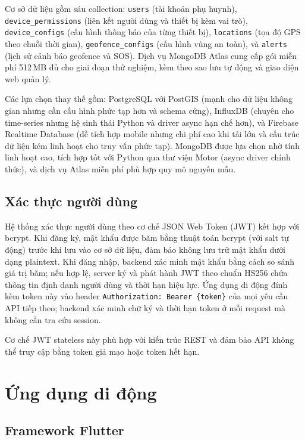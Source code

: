 \documentclass[../DoAn.tex]{subfiles}
\begin{document}
Cơ sở dữ liệu gồm sáu collection: \texttt{users} (tài khoản phụ huynh), \texttt{device\_permissions} (liên kết người dùng và thiết bị kèm vai trò), \texttt{device\_configs} (cấu hình thông báo của từng thiết bị), \texttt{locations} (tọa độ GPS theo chuỗi thời gian), \texttt{geofence\_configs} (cấu hình vùng an toàn), và \texttt{alerts} (lịch sử cảnh báo geofence và SOS). Dịch vụ MongoDB Atlas cung cấp gói miễn phí 512\,MB đủ cho giai đoạn thử nghiệm, kèm theo sao lưu tự động và giao diện web quản lý.

Các lựa chọn thay thế gồm: PostgreSQL với PostGIS (mạnh cho dữ liệu không gian nhưng cần cấu hình phức tạp hơn và schema cứng), InfluxDB (chuyên cho time-series nhưng hệ sinh thái Python và driver async hạn chế hơn), và Firebase Realtime Database (dễ tích hợp mobile nhưng chi phí cao khi tải lớn và cấu trúc dữ liệu kém linh hoạt cho truy vấn phức tạp). MongoDB được lựa chọn nhờ tính linh hoạt cao, tích hợp tốt với Python qua thư viện Motor (async driver chính thức), và dịch vụ Atlas miễn phí phù hợp quy mô nguyên mẫu.

\subsection{Xác thực người dùng}
\label{subsection:3.3.3}

Hệ thống xác thực người dùng theo cơ chế JSON Web Token (JWT) kết hợp với bcrypt. Khi đăng ký, mật khẩu được băm bằng thuật toán bcrypt (với salt tự động) trước khi lưu vào cơ sở dữ liệu, đảm bảo không lưu trữ mật khẩu dưới dạng plaintext. Khi đăng nhập, backend xác minh mật khẩu bằng cách so sánh giá trị băm; nếu hợp lệ, server ký và phát hành JWT theo chuẩn HS256 chứa thông tin định danh người dùng và thời hạn hiệu lực. Ứng dụng di động đính kèm token này vào header \texttt{Authorization: Bearer \{token\}} của mọi yêu cầu API tiếp theo; backend xác minh chữ ký và thời hạn token ở mỗi request mà không cần tra cứu session.

Cơ chế JWT stateless này phù hợp với kiến trúc REST và đảm bảo API không thể truy cập bằng token giả mạo hoặc token hết hạn.

\section{Ứng dụng di động}
\label{section:3.4}

\subsection{Framework Flutter}
\label{subsection:3.4.1}
\end{document}
